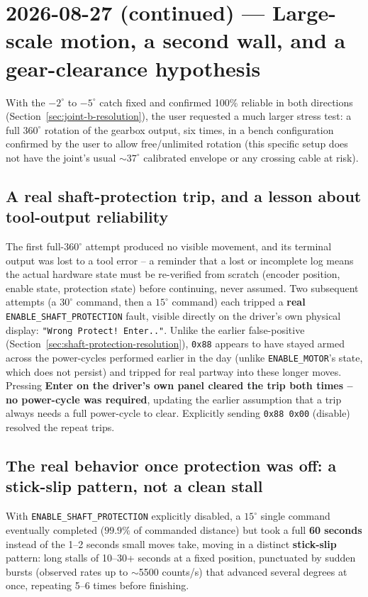 \documentclass[11pt,letterpaper]{article}
\begin{document}
\section{2026-08-27 (continued) --- Large-scale motion, a second wall, and a gear-clearance hypothesis}
\label{sec:session-2026-08-27-large-scale}
With the $-2^\circ$ to $-5^\circ$ catch fixed and confirmed 100\% reliable in both directions (Section~\ref{sec:joint-b-resolution}), the user requested a much larger stress test: a full $360^\circ$ rotation of the gearbox output, six times, in a bench configuration confirmed by the user to allow free/unlimited rotation (this specific setup does not have the joint's usual $\sim$$37^\circ$ calibrated envelope or any crossing cable at risk).

\subsection{A real shaft-protection trip, and a lesson about tool-output reliability}
The first full-$360^\circ$ attempt produced no visible movement, and its terminal output was lost to a tool error -- a reminder that a lost or incomplete log means the actual hardware state must be re-verified from scratch (encoder position, enable state, protection state) before continuing, never assumed. Two subsequent attempts (a $30^\circ$ command, then a $15^\circ$ command) each tripped a \textbf{real} \texttt{ENABLE\_SHAFT\_PROTECTION} fault, visible directly on the driver's own physical display: \texttt{"Wrong Protect! Enter.."}. Unlike the earlier false-positive (Section~\ref{sec:shaft-protection-resolution}), \texttt{0x88} appears to have stayed armed across the power-cycles performed earlier in the day (unlike \texttt{ENABLE\_MOTOR}'s state, which does not persist) and tripped for real partway into these longer moves. Pressing \textbf{Enter on the driver's own panel cleared the trip both times -- no power-cycle was required}, updating the earlier assumption that a trip always needs a full power-cycle to clear. Explicitly sending \texttt{0x88 0x00} (disable) resolved the repeat trips.

\subsection{The real behavior once protection was off: a stick-slip pattern, not a clean stall}
With \texttt{ENABLE\_SHAFT\_PROTECTION} explicitly disabled, a $15^\circ$ single command eventually completed ($99.9\%$ of commanded distance) but took a full \textbf{60 seconds} instead of the 1--2 seconds small moves take, moving in a distinct \textbf{stick-slip} pattern: long stalls of 10--30+ seconds at a fixed position, punctuated by sudden bursts (observed rates up to $\sim$5500 counts/s) that advanced several degrees at once, repeating 5--6 times before finishing.
\end{document}
